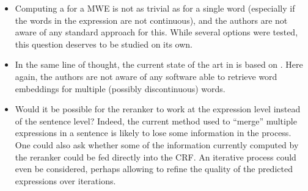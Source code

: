 \documentclass[output=paper
,modfonts
,nonflat]{langsci/langscibook}
\begin{document}
\begin{itemize}
\item Computing a  for a MWE is not as trivial as for a
  single word (especially if the words in the expression are not
  continuous), and the authors are not aware of any standard approach
  for this. While several options were tested, this question deserves
  to be studied on its own.
\item In the same line of thought, the current state of the art in
   is based on 
  \citep{legrand2016phrase}. Here again, the authors are not
  aware of any software able to retrieve word embeddings for multiple
  (possibly discontinuous) words.
\item Would it be possible for the reranker to work at the expression
  level instead of the sentence level? Indeed, the current method used
  to ``merge'' multiple expressions in a sentence is likely to lose
  some information in the process. One could also ask whether some of
  the information currently computed by the reranker could be fed directly
  into the CRF. An iterative process could even be considered, perhaps
  allowing to refine the quality of the predicted expressions over
  iterations.
\end{itemize}







\end{document}
